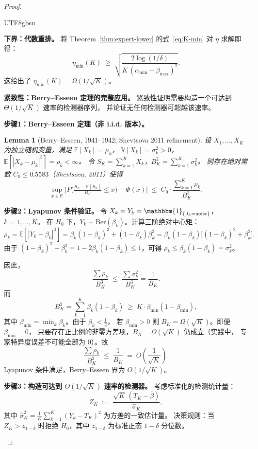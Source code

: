 \documentclass[12pt,a4paper]{article}
\newenvironment{chinese}{\begin{CJK}{UTF8}{gbsn}}{\end{CJK}}
\newtheorem{lemma}[theorem]{Lemma}
\newcommand{\E}{\mathbb{E}}
\newcommand{\V}{\mathbb{V}}
\newcommand{\Ber}{\mathrm{Ber}}
\newcommand{\etamin}{\eta_{\min}}
\begin{document}
\begin{proof}
\begin{chinese}

\textbf{下界：代数重排。}
将 Theorem~\ref{thm:expert-lower} 的式~\eqref{eq:K-min} 对 $\eta$ 求解即得：
\[
\etamin(K) \;\geq\; \sqrt{\frac{2\log(1/\delta)}{K\,(\alpha_{\min}-\beta_{\max})^{2}}}.
\]
这给出了 $\etamin(K) = \Omega(1/\sqrt{K})$。

\textbf{紧致性：Berry--Esseen 定理的完整应用。}
紧致性证明需要构造一个可达到 $\Theta(1/\sqrt{K})$ 速率的检测器序列，
并论证无任何检测器可超越该速率。

\textbf{步骤1：Berry--Esseen 定理（非 i.i.d. 版本）。}
\begin{lemma}[Berry--Esseen, 1941--1942; Shevtsova 2011 refinement]
\label{lem:be}
设 $X_1,\dots,X_K$ 为独立随机变量，满足 $\E[X_k]=\mu_k$，
$\V[X_k]=\sigma_k^{2}>0$，$\E[|X_k-\mu_k|^{3}]=\rho_k<\infty$。
令 $S_K = \sum_{k=1}^{K}X_k$，$B_K^{2} = \sum_{k=1}^{K}\sigma_k^{2}$。
则存在绝对常数 $C_0\leq 0.5583$（Shevtsova, 2011）使得
\[
\sup_{x\in\mathbb{R}} \bigl| P\bigl( \tfrac{S_K - \E[S_K]}{B_K} \leq x \bigr) - \Phi(x) \bigr|
\;\leq\; C_0\cdot \frac{\sum_{k=1}^{K}\rho_k}{B_K^{3}}.
\]
\end{lemma}

\textbf{步骤2：Lyapunov 条件验证。}
令 $X_k = Y_k = \mathbbm{1}_{\{J_k=\mathrm{noise}\}}$，$k=1,\dots,K$。
在 $H_0$ 下，$Y_k\sim\Ber(\beta_k)$。计算三阶绝对中心矩：
\[
\rho_k = \E[|Y_k-\beta_k|^{3}]
= \beta_k(1-\beta_k)^{3} + (1-\beta_k)\beta_k^{3}
= \beta_k(1-\beta_k)\bigl[(1-\beta_k)^{2}+\beta_k^{2}\bigr].
\]
由于 $(1-\beta_k)^{2}+\beta_k^{2} = 1 - 2\beta_k(1-\beta_k) \leq 1$，可得
$\rho_k \leq \beta_k(1-\beta_k) = \sigma_k^{2}$。

因此，
\[
\frac{\sum\rho_k}{B_K^{3}} \;\leq\; \frac{\sum\sigma_k^{2}}{B_K^{3}} = \frac{1}{B_K}.
\]
而
\[
B_K^{2} = \sum_{k=1}^{K}\beta_k(1-\beta_k) \;\geq\; K\cdot\beta_{\min}(1-\beta_{\min}),
\]
其中 $\beta_{\min}=\min_k\beta_k$。由于 $\beta_k<\frac12$，
若 $\beta_{\min}>0$ 则 $B_K = \Omega(\sqrt{K})$。即便 $\beta_{\min}=0$，
只要存在正比例的非零方差项，$B_K = \Omega(\sqrt{K})$ 仍成立（实践中，
专家特异度误差不可能全部为 $0$）。故
\[
\frac{\sum\rho_k}{B_K^{3}} \;\leq\; \frac{1}{B_K} \;=\; O\!\left(\frac1{\sqrt{K}}\right).
\]
Lyapunov 条件满足，Berry--Esseen 界为 $O(1/\sqrt{K})$。

\textbf{步骤3：构造可达到 $\Theta(1/\sqrt{K})$ 速率的检测器。}
考虑标准化的检测统计量：
\[
Z_K \;:=\; \frac{\sqrt{K}\,(T_K - \bar{\beta})}{\hat\sigma_K},
\]
其中 $\hat\sigma_K^{2} = \frac1K\sum_{k=1}^{K}(Y_k - T_K)^{2}$ 为方差的一致估计量。
决策规则：当 $Z_K > z_{1-\delta}$ 时拒绝 $H_0$，其中 $z_{1-\delta}$ 为标准正态
$1-\delta$ 分位数。


\end{chinese}
\end{proof}
\end{document}
